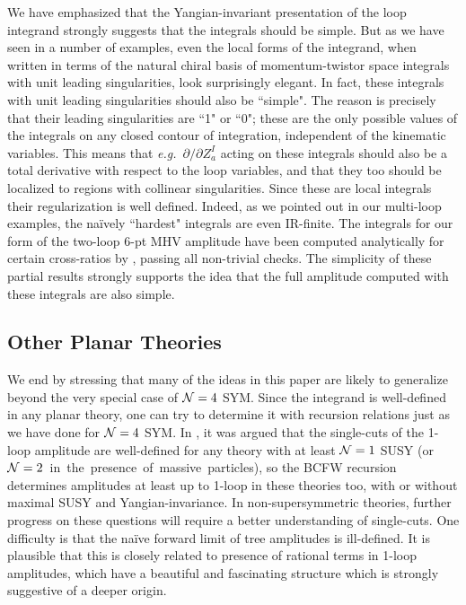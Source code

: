\documentclass[11pt, reqno]{article}
\begin{document}
We have emphasized that the Yangian-invariant presentation of the loop
integrand strongly suggests that the integrals should be simple.
But as we have seen in a number of examples, even the local
forms of the integrand, when written in terms of the natural chiral
basis of momentum-twistor space integrals with unit leading
singularities, look  surprisingly elegant. In fact, these integrals with unit leading singularities should also be
``simple". The reason is precisely that their leading
singularities are ``1" or ``0"; these are the only possible values of
the integrals on any closed contour of integration, independent
of the kinematic variables. This means that {\it e.g.}~$\partial/\partial
Z_a^I$ acting on these integrals should also be a total derivative with
respect to the loop variables, and that they too should be localized
to regions with collinear singularities. Since these are local integrals their regularization is well defined. Indeed, as we pointed out in our multi-loop examples, the na\"{i}vely ``hardest" integrals are even IR-finite. The integrals for our form of the two-loop 6-pt MHV amplitude have been computed analytically for certain cross-ratios by \cite{JJwip}, passing all non-trivial checks. The simplicity of these partial results strongly 
supports the idea that the full amplitude computed with these integrals are also simple. 
\subsection{Other Planar Theories}

We end by stressing that many of the ideas in this paper are likely to generalize beyond the very special case of ${\cal N}=4$ SYM. Since the integrand is well-defined  in any planar theory, one can try to determine it with recursion relations just as we have done for ${\cal N}=4$ SYM.
In \cite{CaronHuot:2010zt}, it was argued that the single-cuts of the 1-loop amplitude are well-defined for any theory with at least ${\cal N}=1$ SUSY \mbox{(or ${\cal N}=2$ in the presence of massive particles}), so the BCFW recursion determines amplitudes at least up to 1-loop in these theories too, with or without maximal SUSY and Yangian-invariance.
In non-supersymmetric theories, further progress on these questions will require a better understanding of single-cuts.
One difficulty is that the na\"ive forward limit of tree amplitudes is ill-defined.
It is plausible that this is closely related to presence of rational terms in 1-loop amplitudes, which have a beautiful and fascinating structure which is strongly suggestive of a deeper origin.
\end{document}
